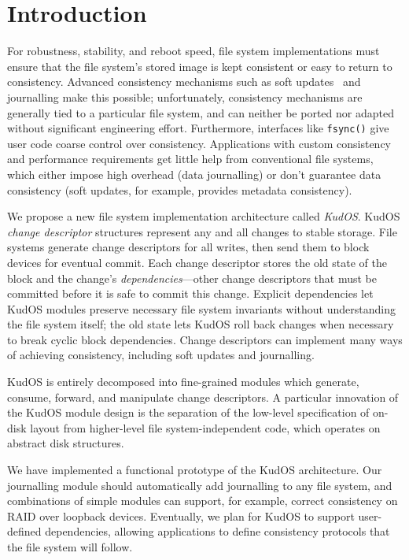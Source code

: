 
\section*{Introduction}
\label{sec:intro}

For robustness, stability, and reboot speed, file system implementations
must ensure that the file system's stored image is kept consistent
or easy to return to consistency.
%
Advanced consistency mechanisms such as soft updates~\cite{ganger00soft}
and journalling make this possible; unfortunately,
%
consistency mechanisms are generally tied to a particular file system, and
can neither be ported nor adapted without significant engineering
effort.
%
Furthermore, interfaces like \verb+fsync()+ give user code coarse control
over consistency.
%
Applications with custom consistency and performance requirements get
little help from conventional file systems, which either impose high
overhead (data journalling) or don't guarantee data consistency (soft
updates, for example, provides metadata consistency).



We propose a new file system implementation architecture called
\emph{KudOS}.
%
KudOS \emph{change descriptor} structures represent any and all changes to
stable storage.
%
File systems generate change descriptors for all writes, then
send them to block devices for eventual commit.
%
Each change descriptor stores the old state of the block and the change's
\emph{dependencies}---other change descriptors that must be committed before
it is safe to commit this change.
%
Explicit dependencies let KudOS modules preserve necessary file system
invariants without understanding the file system itself; the old state
lets KudOS roll back changes when necessary to break cyclic block dependencies.
%
Change descriptors can implement many ways of achieving
consistency, including soft updates and journalling.

KudOS is entirely decomposed into fine-grained modules which generate, consume,
forward, and manipulate change descriptors. A particular innovation of the KudOS
module design is the separation of the low-level specification of on-disk layout
from higher-level file system-independent code, which operates on abstract disk
structures.

We have implemented a functional prototype of the KudOS
architecture.
%
Our journalling module should automatically add journalling to any file
system, and combinations of simple modules can support, for example,
correct consistency on RAID over loopback devices.
%
Eventually, we plan for KudOS to support user-defined dependencies,
allowing applications to define consistency protocols that the file system
will follow.

%
%
